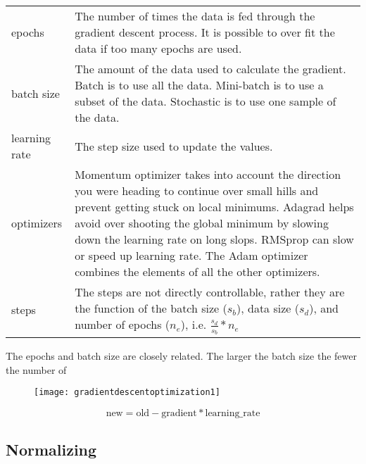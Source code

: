     \begin{topcaptiontable}
        \centering
        \label{tab:gradientdescentoptimization}
		\begin{tabular}{|l|p{}|} \hline
				\tablecolumnheadervlinesone{Parameter} & \tablecolumnheadervlinestwo{Description} \\ \hline
				epochs &
	            The number of times the data is fed through the gradient descent process.  It is possible to over fit the data if too many epochs are used. \\ \hline
				batch size &
				The amount of the data used to calculate the gradient.  Batch is to use all the data.  Mini-batch is to use a subset of the data.  Stochastic is to use one sample of the data. \\ \hline
				learning rate &
				The step size used to update the values. \\ \hline
				optimizers &
				Momentum optimizer takes into account the direction you were heading to continue over small hills and prevent getting stuck on local minimums.  Adagrad helps avoid over shooting the global minimum by slowing down the learning rate on long slops.  RMSprop can slow or speed up learning rate.  The Adam optimizer combines the elements of all the other optimizers. \\ \hline
				steps &
				The steps are not directly controllable, rather they are the function of the batch size ($s_b$), data size ($s_d$), and number of epochs ($n_e$), i.e. $\frac{s_d}{s_b}*n_e$ \\ \hline
		\end{tabular}
	\end{topcaptiontable}

The epochs and batch size are closely related.  The larger the batch size the fewer the number of


 	\begin{figure}[h]
		\centering
		\texttt{[image: gradientdescentoptimization1]}
		\caption{}
		\label{fig:gradientdescentoptimization1}
	\end{figure}

	\begin{equation}
		\textrm{new} = \textrm{old} - \textrm{gradient} * \textrm{learning\_rate}
	\end{equation}



	\subsection{Normalizing}

